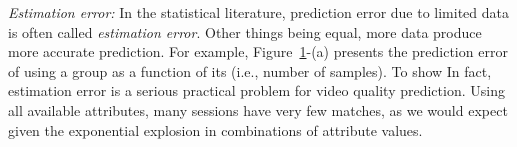 \begin{packedenumerate}
  \item \emph{Estimation error:} In the statistical literature, prediction error due to limited data is often called {\it estimation error}.  Other things being equal, more data produce more accurate prediction. For example, Figure~\ref{fig:group-size-impact}-(a) presents the prediction error of using a group as a function of its (i.e., number of samples). To show  In fact, estimation error is a serious practical problem for video quality prediction.  Using all available attributes, many sessions have very few matches, as we would expect given the exponential explosion in combinations of attribute values.  

\begin{figure}[h!]
\centering
{}
\label{fig:group-size-impact}
\end{figure}


\end{packedenumerate}
